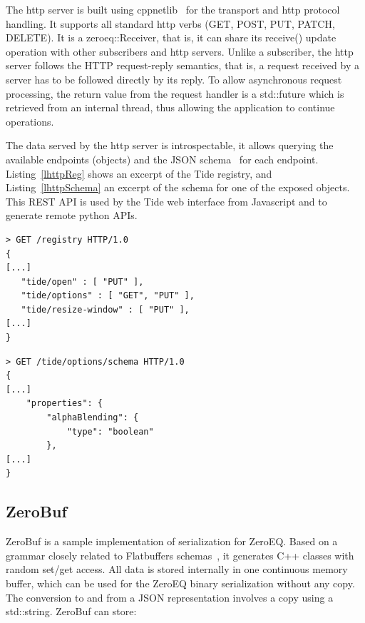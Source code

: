 \documentclass[10pt]{llncs}
\newcommand{\lref}[1]{Listing~\ref{#1}}
\begin{document}
The http server is built using cppnetlib~\cite{cppnetlib} for the transport and
http protocol handling. It supports all standard http verbs (GET, POST, PUT,
PATCH, DELETE). It is a \textsf{zeroeq::Receiver}, that is, it can share its
\textsf{receive()} update operation with other subscribers and http servers.
Unlike a subscriber, the http server follows the HTTP request-reply semantics,
that is, a request received by a server has to be followed directly by its
reply. To allow asynchronous request processing, the return value from the
request handler is a \textsf{std::future} which is retrieved from an internal
thread, thus allowing the application to continue operations.

The data served by the http server is introspectable, it allows querying the
available endpoints (objects) and the JSON schema~\cite{jsonschema} for each
endpoint. \lref{lhttpReg} shows an excerpt of the Tide registry, and
\lref{lhttpSchema} an excerpt of the schema for one of the exposed objects. This
REST API is used by the Tide web interface from Javascript and to generate
remote python APIs.

\noindent\begin{minipage}[b][][b]{.48\textwidth}
\begin{lstlisting}[caption=HTTP Server Registry, label=lhttpReg]
> GET /registry HTTP/1.0
{
[...]
   "tide/open" : [ "PUT" ],
   "tide/options" : [ "GET", "PUT" ],
   "tide/resize-window" : [ "PUT" ],
[...]
}
\end{lstlisting}
\end{minipage}\hfill
\begin{minipage}[b][][b]{.48\textwidth}
\begin{lstlisting}[caption=Object JSON Schema, label=lhttpSchema]
> GET /tide/options/schema HTTP/1.0
{
[...]
    "properties": {
        "alphaBlending": {
            "type": "boolean"
        },
[...]
}
\end{lstlisting}
\end{minipage}

\subsection{ZeroBuf}

ZeroBuf is a sample implementation of serialization for ZeroEQ. Based on a
grammar closely related to Flatbuffers schemas~\cite{flatbuffers}, it generates
C++ classes with random \textsf{set/get} access. All data is stored internally
in one continuous memory buffer, which can be used for the ZeroEQ binary
serialization without any copy. The conversion to and from a JSON representation
involves a copy using a \textsf{std::string}. ZeroBuf can store:
\end{document}
